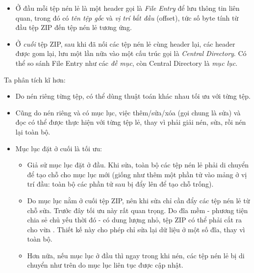 \documentclass[../../thesis]{subfiles}
\begin{document}
\begin{itemize}[resume, before = \vspace*{-\dimexpr\topsep+\partopsep\relax}]
    \item
        Ở đầu mỗi tệp nén lẻ là một header gọi là \emph{File Entry} để lưu thông
        tin liên quan, trong đó có \emph{tên tệp gốc} và \emph{vị trí bắt đầu}
        (offset), tức số byte tính từ đầu tệp ZIP đến tệp nén lẻ tương ứng.
    \item
        Ở \emph{cuối} tệp ZIP, sau khi đã nối các tệp nén lẻ cùng header lại,
        các header được gom lại, lưu một lần nữa vào một cấu trúc gọi là
        \emph{Central Directory}. Có thể so sánh File Entry như các \emph{đề
        mục}, còn Central Directory là \emph{mục lục}.
\end{itemize}

Ta phân tích kĩ hơn:

\begin{itemize}
    \item
        Do nén riêng từng tệp, có thể dùng thuật toán khác nhau tối ưu với từng
        tệp.
    \item
        Cũng do nén riêng và có mục lục, việc thêm/sửa/xóa (gọi chung là sửa) và
        đọc có thể được thực hiện với từng tệp lẻ, thay vì phải giải nén, sửa,
        rồi nén lại toàn bộ.
\end{itemize}

\begin{itemize}[resume, before = \vspace*{-\dimexpr\topsep+\partopsep\relax}]
    \item
        Mục lục đặt ở cuối là tối ưu:

        \begin{itemize}
            \item
                Giả sử mục lục đặt ở đầu. Khi sửa, toàn bộ các tệp nén lẻ phải
                di chuyển để tạo chỗ cho mục lục mới (giống như thêm một phần tử
                vào mảng ở vị trí đầu: toàn bộ các phần tử sau bị đẩy lên để tạo
                chỗ trống).
            \item
                Do mục lục nằm ở cuối tệp ZIP, nên khi sửa chỉ cần đẩy các tệp
                nén lẻ từ chỗ sửa. Trước đây tối ưu này rất quan trọng. Do đĩa
                mềm - phương tiện chia sẻ chủ yếu thời đó - có dung lượng nhỏ,
                tệp ZIP có thể phải cắt ra cho vừa \cite{WIKI_ZIP}. Thiết kế này
                cho phép chỉ sửa lại dữ liệu ở một số đĩa, thay vì toàn bộ.
            \item
                Hơn nữa, nếu mục lục ở đầu thì ngay trong khi nén, các tệp nén
                lẻ bị di chuyển như trên do mục lục liên tục được cập nhật.
        \end{itemize}
\end{itemize}
\end{document}

